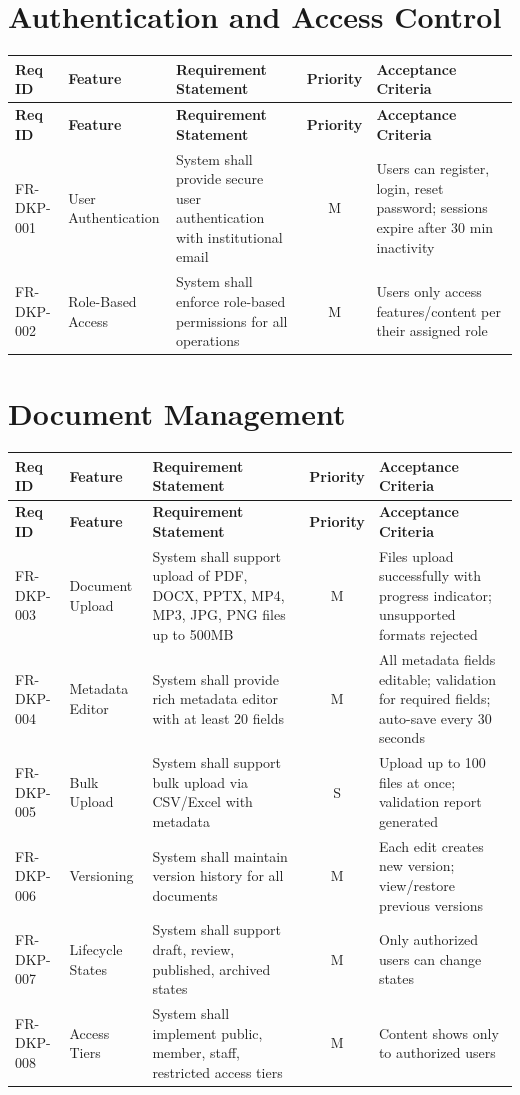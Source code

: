 \documentclass[12pt,a4paper]{report}
\begin{document}
\section{Authentication and Access Control}
\begin{longtable}{|p{2cm}|p{3cm}|p{5cm}|c|p{3cm}|}
\hline
\textbf{Req ID} & \textbf{Feature} & \textbf{Requirement Statement} & \textbf{Priority} & \textbf{Acceptance Criteria} \\ \hline
\endfirsthead
\hline
\textbf{Req ID} & \textbf{Feature} & \textbf{Requirement Statement} & \textbf{Priority} & \textbf{Acceptance Criteria} \\ \hline
\endhead
FR-DKP-001 & User Authentication & System shall provide secure user authentication with institutional email & M & Users can register, login, reset password; sessions expire after 30 min inactivity \\ \hline
FR-DKP-002 & Role-Based Access & System shall enforce role-based permissions for all operations & M & Users only access features/content per their assigned role \\ \hline
\end{longtable}

\section{Document Management}
\begin{longtable}{|p{2cm}|p{3cm}|p{5cm}|c|p{3cm}|}
\hline
\textbf{Req ID} & \textbf{Feature} & \textbf{Requirement Statement} & \textbf{Priority} & \textbf{Acceptance Criteria} \\ \hline
\endfirsthead
\hline
\textbf{Req ID} & \textbf{Feature} & \textbf{Requirement Statement} & \textbf{Priority} & \textbf{Acceptance Criteria} \\ \hline
\endhead
FR-DKP-003 & Document Upload & System shall support upload of PDF, DOCX, PPTX, MP4, MP3, JPG, PNG files up to 500MB & M & Files upload successfully with progress indicator; unsupported formats rejected \\ \hline
FR-DKP-004 & Metadata Editor & System shall provide rich metadata editor with at least 20 fields & M & All metadata fields editable; validation for required fields; auto-save every 30 seconds \\ \hline
FR-DKP-005 & Bulk Upload & System shall support bulk upload via CSV/Excel with metadata & S & Upload up to 100 files at once; validation report generated \\ \hline
FR-DKP-006 & Versioning & System shall maintain version history for all documents & M & Each edit creates new version; view/restore previous versions \\ \hline
FR-DKP-007 & Lifecycle States & System shall support draft, review, published, archived states & M & Only authorized users can change states \\ \hline
FR-DKP-008 & Access Tiers & System shall implement public, member, staff, restricted access tiers & M & Content shows only to authorized users \\ \hline
\end{longtable}
\end{document}
